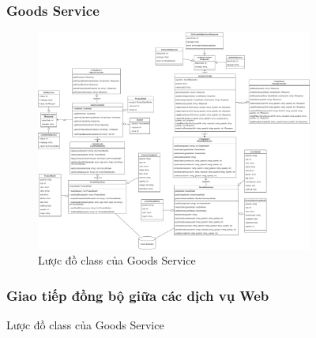 \begin{figure}[!htp]
\subsubsection{Goods Service}
\begin{figure}[!htp]
	\centering
	\includegraphics[width=17cm]{img/Architecture/service/GoodsService.png}
	\newline
	\caption{Lược đồ class của Goods Service}
\end{figure}


\newpage
\subsubsection{Giao tiếp đồng bộ giữa các dịch vụ Web}


\end{figure}
